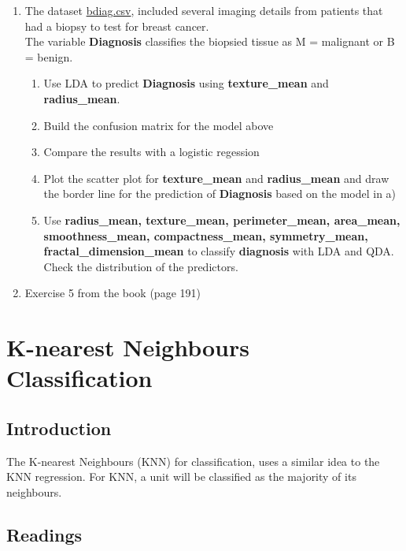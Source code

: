 \documentclass[
]{book}
\begin{document}
\begin{enumerate}
\def\labelenumi{\arabic{enumi})}
\item
  The dataset \href{https://www.dropbox.com/s/fvj7774lmyneab6/bdiag.csv?dl=1}{bdiag.csv},
  included several imaging details from patients that had a biopsy to test for
  breast cancer.\\
  The variable \textbf{Diagnosis} classifies the biopsied tissue as M = malignant or
  B = benign.

  \begin{enumerate}
  \def\labelenumii{\alph{enumii})}
  \item
    Use LDA to predict \textbf{Diagnosis} using \textbf{texture\_mean}
    and \textbf{radius\_mean}.
  \item
    Build the confusion matrix for the model above
  \item
    Compare the results with a logistic regession
  \item
    Plot the scatter plot for \textbf{texture\_mean}
    and \textbf{radius\_mean} and draw the border line for the prediction of
    \textbf{Diagnosis} based on the model in a)
  \item
    Use \textbf{radius\_mean, texture\_mean, perimeter\_mean, area\_mean,
    smoothness\_mean, compactness\_mean, symmetry\_mean,
    fractal\_dimension\_mean} to classify \textbf{diagnosis} with LDA and QDA.
    Check the distribution of the predictors.
  \end{enumerate}
\item
  Exercise 5 from the book (page 191)
\end{enumerate}

\chapter{K-nearest Neighbours Classification}\label{k-nearest-neighbours-classification}

\section{Introduction}\label{knnc.intro}

The K-nearest Neighbours (KNN) for classification, uses a similar idea to the
KNN regression. For KNN, a unit will be classified as the majority of its
neighbours.

\section{Readings}\label{knnc.read}
\end{document}

